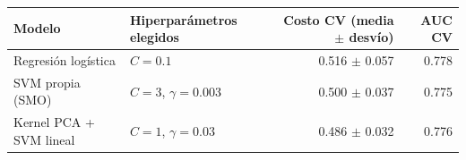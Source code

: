 \begin{tabular}{llrr}
\toprule
Modelo & Hiperparámetros elegidos & Costo CV (media $\pm$ desvío) & AUC CV \\
\midrule
Regresión logística & $C = \num{0.1}$ & \num{0.516} $\pm$ \num{0.057} & \num{0.778} \\
SVM propia (SMO) & $C = \num{3}$, $\gamma = \num{0.003}$ & \num{0.500} $\pm$ \num{0.037} & \num{0.775} \\
Kernel PCA + SVM lineal & $C = \num{1}$, $\gamma = \num{0.03}$ & \num{0.486} $\pm$ \num{0.032} & \num{0.776} \\
\bottomrule
\end{tabular}
